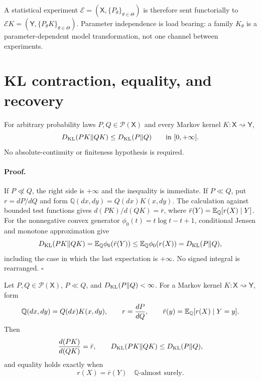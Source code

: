 A statistical experiment
\(\mathcal E=(\mathsf X,\{P_\theta\}_{\theta\in\Theta})\) is therefore sent
functorially to
\(\mathcal EK=(\mathsf Y,\{P_\theta K\}_{\theta\in\Theta})\).
Parameter independence is load bearing: a family \(K_\theta\) is a
parameter-dependent model transformation, not one channel between
experiments. 

\section{KL contraction, equality, and recovery}
\label{sec:cg-kl-recovery}

For arbitrary probability laws $P,Q\in\mathcal P(\mathsf X)$ and every Markov kernel $K:\mathsf X\rightsquigarrow\mathsf Y$,
\begin{equation}
D_{\mathrm{KL}}(PK\Vert QK)\leq D_{\mathrm{KL}}(P\Vert Q)
\qquad\text{in }[0,+\infty].
\label{eq:cg-kl-dpi-extended}
\end{equation}
No absolute-continuity or finiteness hypothesis is required. 

\paragraph{Proof.}
If $P\not\ll Q$, the right side is $+\infty$ and the inequality is immediate. If $P\ll Q$, put $r=dP/dQ$ and form $\mathbb Q(dx,dy)=Q(dx)K(x,dy)$. The calculation against bounded test functions gives $d(PK)/d(QK)=\bar r$, where $\bar r(Y)=\mathbb E_{\mathbb Q}[r(X)\mid Y]$. For the nonnegative convex generator $\phi_0(t)=t\log t-t+1$, conditional Jensen and monotone approximation give
\[
D_{\mathrm{KL}}(PK\Vert QK)
=\mathbb E_{\mathbb Q}\phi_0(\bar r(Y))
\leq\mathbb E_{\mathbb Q}\phi_0(r(X))
=D_{\mathrm{KL}}(P\Vert Q),
\]
including the case in which the last expectation is $+\infty$. No signed integral is rearranged. \(\square\)

\medskip
{}
Let \(P,Q\in\mathcal P(\mathsf X)\), \(P\ll Q\), and
\(D_{\mathrm{KL}}(P\Vert Q)<\infty\). For a Markov kernel
\(K:\mathsf X\rightsquigarrow\mathsf Y\), form
\[
\mathbb Q(dx,dy)=Q(dx)K(x,dy),\qquad
r=\frac{dP}{dQ},\qquad
\bar r(y)=\mathbb E_{\mathbb Q}[r(X)\mid Y=y].
\]
Then
\begin{equation}
\frac{d(PK)}{d(QK)}=\bar r,\qquad
D_{\mathrm{KL}}(PK\Vert QK)\leq D_{\mathrm{KL}}(P\Vert Q),
\label{eq:cg-kl-dpi}
\end{equation}
and equality holds exactly when
\begin{equation}
r(X)=\bar r(Y)\quad\mathbb Q\text{-almost surely}.
\label{eq:cg-kl-equality}
\end{equation}


